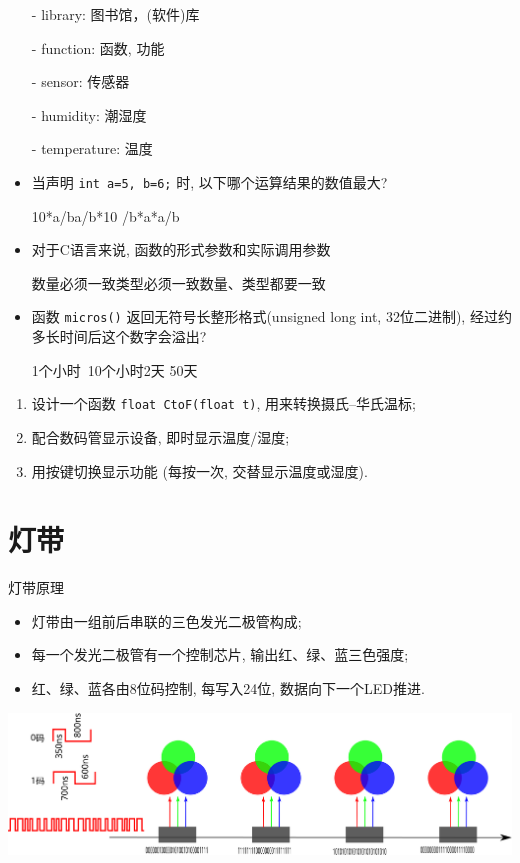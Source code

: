 \documentclass[a4paper,11pt]{seminar}
\begin{document}
\begin{itemize}
    \item[-] library: 图书馆，(软件)库
    \item[-] function: 函数, 功能
    \item[-] sensor: 传感器
    \item[-] humidity: 潮湿度
    \item[-] temperature: 温度
\end{itemize}
\endslide

\begin{itemize}
    \item 当声明 \verb|int a=5, b=6;| 时, 以下哪个运算结果的数值最大?

        10*a/b\qquad\qquad a/b*10 \qquad{}/b*a\qquad{}*a/b
    \item 对于C语言来说, 函数的形式参数和实际调用参数

    数量必须一致\qquad\qquad  类型必须一致\qquad\qquad 数量、类型都要一致

    \item 函数 \verb|micros()| 返回无符号长整形格式(unsigned long int,
        32位二进制), 经过约多长时间后这个数字会溢出?

    1个小时\qquad\qquad\ 10个小时\qquad\qquad 2天 \qquad\qquad 50天
\end{itemize}
\endslide


\begin{enumerate}
    \item 设计一个函数 \verb|float CtoF(float t)|, 用来转换摄氏--华氏温标;
    \item 配合数码管显示设备, 即时显示温度/湿度;
    \item 用按键切换显示功能 (每按一次, 交替显示温度或湿度).
\end{enumerate}
\endslide


\chapter{灯带}{灯带原理}
\begin{itemize}
    \item 灯带由一组前后串联的三色发光二极管构成;
    \item 每一个发光二极管有一个控制芯片, 输出红、绿、蓝三色强度;
    \item 红、绿、蓝各由8位码控制, 每写入24位, 数据向下一个LED推进.
\end{itemize}
\begin{center}
\includegraphics[width=.9\textwidth]{stripe}
\end{center}
\endslide
\end{document}
